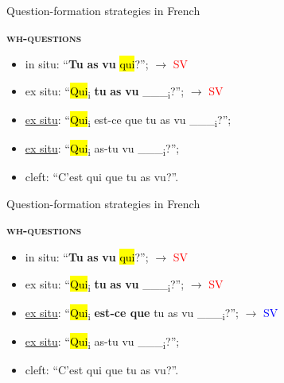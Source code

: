 \documentclass[lesson_slides]{subfiles}
\begin{document}
\begin{frame}[c]{Question-formation strategies in French}

    \noindent \textbf{\textsc{wh-questions}}
    \begin{itemize}
        \item[\ding{227}] in situ: “\textbf{Tu} \textbf{as} \textbf{vu} \hl{qui}?”; $\longrightarrow$ \textcolor{red}{SV}
        \item[\ding{227}] ex situ: “\hl{Qui}\textsubscript{i} \textbf{tu} \textbf{as} \textbf{vu} \_\_\_\textsubscript{i}?”;  $\longrightarrow$ \textcolor{red}{SV}
        \item[\ding{227}] \underline{ex situ}: “\hl{Qui}\textsubscript{i} est-ce que tu as vu \_\_\_\textsubscript{i}?”; 
        \item[\ding{227}] \underline{ex situ}: “\hl{Qui}\textsubscript{i} as-tu vu \_\_\_\textsubscript{i}?”;
        \item[\ding{227}] cleft: “C’est qui que tu as vu?”.
    \end{itemize}
   
\end{frame}
\begin{frame}[c]{Question-formation strategies in French}

    \noindent \textbf{\textsc{wh-questions}}
    \begin{itemize}
        \item[\ding{227}] in situ: “\textbf{Tu} \textbf{as} \textbf{vu} \hl{qui}?”; $\longrightarrow$ \textcolor{red}{SV}
        \item[\ding{227}] ex situ: “\hl{Qui}\textsubscript{i} \textbf{tu} \textbf{as} \textbf{vu} \_\_\_\textsubscript{i}?”;  $\longrightarrow$ \textcolor{red}{SV}
        \item[\ding{227}] \underline{ex situ}: “\hl{Qui}\textsubscript{i} \textbf{est-ce que} tu as vu \_\_\_\textsubscript{i}?”; $\longrightarrow$ \textcolor{blue}{SV}
        \item[\ding{227}] \underline{ex situ}: “\hl{Qui}\textsubscript{i} as-tu vu \_\_\_\textsubscript{i}?”;
        \item[\ding{227}] cleft: “C’est qui que tu as vu?”.
    \end{itemize}
   
\end{frame}
\end{document}
